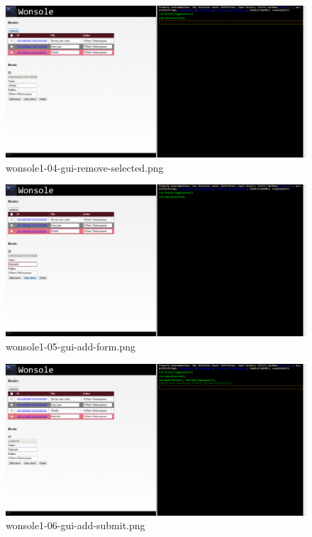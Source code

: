 \begin{figure}
\includegraphics[width=\textwidth]{screenshot/wonsole1-04-gui-remove-selected.png}
\caption{wonsole1-04-gui-remove-selected.png}
\label{wonsole1-04-gui-remove-selected.png}
\end{figure}


\clearpage
\begin{figure}
\includegraphics[width=\textwidth]{screenshot/wonsole1-05-gui-add-form.png}
\caption{wonsole1-05-gui-add-form.png}
\label{wonsole1-05-gui-add-form.png}
\end{figure}


\begin{figure}
\includegraphics[width=\textwidth]{screenshot/wonsole1-06-gui-add-submit.png}
\caption{wonsole1-06-gui-add-submit.png}
\label{wonsole1-06-gui-add-submit.png}
\end{figure}


